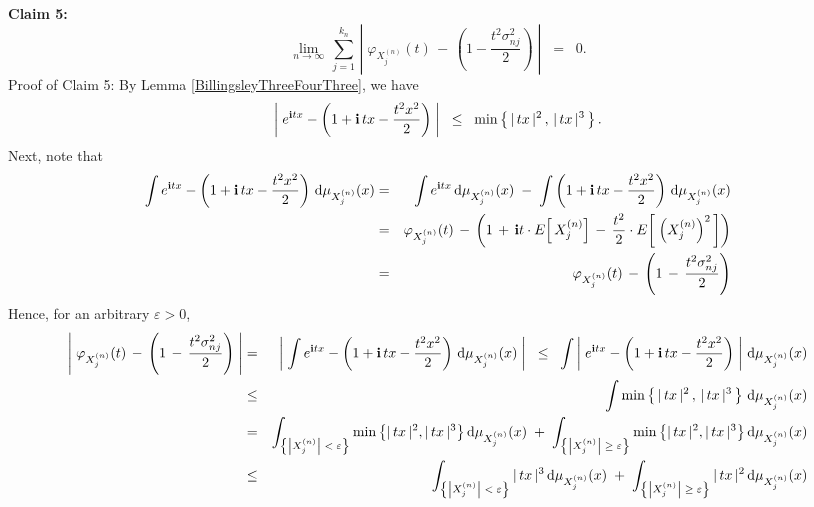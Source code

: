 \vskip 0.5cm
\noindent
\textbf{Claim 5:}
\begin{equation*}
\lim_{n\rightarrow\infty}\,
\sum_{j=1}^{k_{n}}\,
\left\vert\;\varphi_{X^{(n)}_{j}}(t) \, - \, \left(1 - \dfrac{t^{2}\sigma^{2}_{nj}}{2}\right)\;\right\vert
\;\;=\;\; 0.
\end{equation*}
{\small Proof of Claim 5: By Lemma \ref{BillingsleyThreeFourThree}, we have
\begin{equation*}
\left\vert\;
e^{\textnormal{\bf i} tx} - \left(1 + \textnormal{\bf i}\,tx - \dfrac{t^2x^2}{2}\right)
\;\right\vert
\;\;\leq\;\;
\min\left\{\,
\vert\,tx\,\vert^{2}
\,,\,
\vert\,tx\,\vert^{3}
\,\right\}.
\end{equation*}
Next, note that
\begin{eqnarray*}
\int e^{\textnormal{\bf i} tx} - \left(1 + \textnormal{\bf i}\,tx - \dfrac{t^2x^2}{2}\right)\,\textnormal{d}\mu_{X^{(n)}_{j}}(x)
&=&
\int e^{\textnormal{\bf i} tx} \,\textnormal{d}\mu_{X^{(n)}_{j}}(x) \; -\; \int \left(1 + \textnormal{\bf i}\,tx - \dfrac{t^2x^2}{2}\right) \,\textnormal{d}\mu_{X^{(n)}_{j}}(x)
\\
&=&
\varphi_{X^{(n)}_{j}}(t) \, - \, \left(1 \, + \, \textnormal{\bf i} t \cdot E\!\left[\,X^{(n)}_{j}\right] \, - \, \dfrac{t^{2}}{2}\cdot E\!\left[\;\left(X^{(n)}_{j}\right)^{2}\,\right]\right)
\\
&=&
\varphi_{X^{(n)}_{j}}(t) \, - \, \left(1 \, - \, \dfrac{t^{2}\sigma^{2}_{nj}}{2}\right)
\end{eqnarray*}
Hence, for an arbitrary $\varepsilon > 0$,
\begin{eqnarray*}
\left\vert\;
\varphi_{X^{(n)}_{j}}(t) \, - \, \left(1 \, - \, \dfrac{t^{2}\sigma^{2}_{nj}}{2}\right)
\;\right\vert
&=&\left\vert\;
\int e^{\i tx} - \left(1 + \i\,tx - \dfrac{t^2x^2}{2}\right)\,\d\mu_{X^{(n)}_{j}}(x)
\;\right\vert
\;\;\leq\;\;
\int
\left\vert\;
e^{\i tx} - \left(1 + \i\,tx - \dfrac{t^2x^2}{2}\right)
\;\right\vert
\,\d\mu_{X^{(n)}_{j}}(x)
\\
&\leq&
\int
\min\left\{\,
\vert\,tx\,\vert^{2}
\,,\,
\vert\,tx\,\vert^{3}
\,\right\}
\,\d\mu_{X^{(n)}_{j}}(x)
\\
&=&
\int_{\left\{\left\vert X^{(n)}_{j} \right\vert\;<\;\varepsilon\right\}}\min\left\{\vert\,tx\,\vert^{2},\vert\,tx\,\vert^{3}\right\}\d\mu_{X^{(n)}_{j}}(x)
\;+\;
\int_{\left\{\left\vert X^{(n)}_{j} \right\vert\;\geq\;\varepsilon\right\}}\min\left\{\vert\,tx\,\vert^{2},\vert\,tx\,\vert^{3}\right\}\d\mu_{X^{(n)}_{j}}(x)
\\
&\leq&
\int_{\left\{\left\vert X^{(n)}_{j} \right\vert\;<\;\varepsilon\right\}} \vert\,tx\,\vert^{3} \,\d\mu_{X^{(n)}_{j}}(x)
\;+\;
\int_{\left\{\left\vert X^{(n)}_{j} \right\vert\;\geq\;\varepsilon\right\}} \vert\,tx\,\vert^{2} \,\d\mu_{X^{(n)}_{j}}(x)

\end{eqnarray*}}
